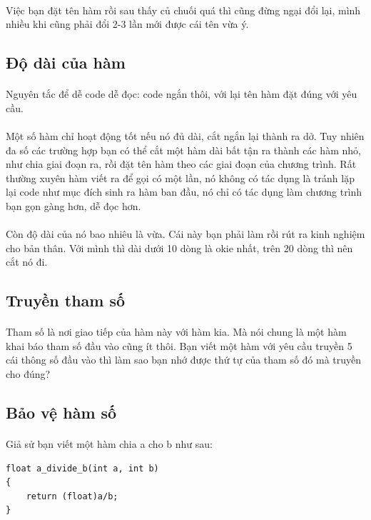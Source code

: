 \documentclass[12pt,a5paper]{book}
\begin{document}
\paragraph{}
Việc bạn đặt tên hàm rồi sau thấy củ chuối quá thì cũng đừng ngại đổi lại, mình nhiều khi cũng phải đổi 2-3 lần mới được cái tên vừa ý.
\subsection{Độ dài của hàm}
\paragraph{}
Nguyên tắc để dễ code dễ đọc: code ngắn thôi, với lại tên hàm đặt đúng với yêu cầu. 
\paragraph{}
Một số hàm chỉ hoạt động tốt nếu nó đủ dài, cắt ngắn lại thành ra dở. Tuy nhiên đa số các trường hợp bạn có thể cắt một hàm dài bất tận ra thành các hàm nhỏ, như chia giai đoạn ra, rồi đặt tên hàm theo các giai đoạn của chương trình. Rất thường xuyên hàm viết ra để gọi có một lần, nó không có tác dụng là tránh lặp lại code như mục đích sinh ra hàm ban đầu, nó chỉ có tác dụng làm chương trình bạn gọn gàng hơn, dễ đọc hơn.
\paragraph{}
Còn độ dài của nó bao nhiêu là vừa. Cái này bạn phải làm rồi rút ra kinh nghiệm cho bản thân. Với mình thì dài dưới 10 dòng là okie nhất, trên 20 dòng thì nên cắt nó đi.
\subsection{Truyền tham số}
\paragraph{}
Tham số là nơi giao tiếp của hàm này với hàm kia. Mà nói chung là một hàm khai báo tham số đầu vào cũng ít thôi. Bạn viết một hàm với yêu cầu truyền 5 cái thông số đầu vào thì làm sao bạn nhớ được thứ tự của tham số đó mà truyền cho đúng?
\subsection{Bảo vệ hàm số}
\paragraph{}
Giả sử bạn viết một hàm chia a cho b như sau:
\begin{lstlisting}
float a_divide_b(int a, int b)
{
	return (float)a/b;
}
\end{lstlisting}
\end{document}
